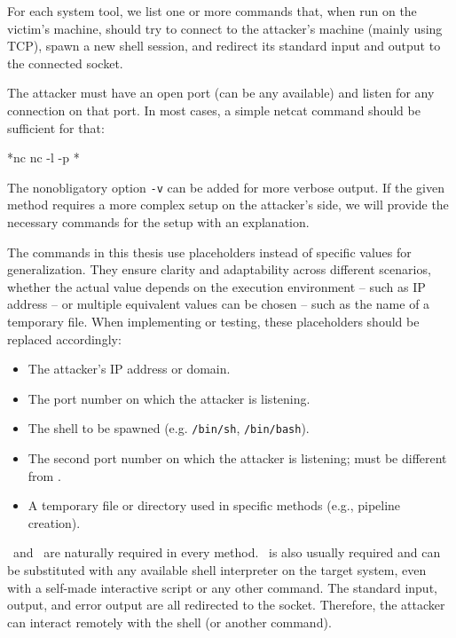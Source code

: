 For each system tool, we list one or more commands that, when run on the victim's machine, should try to connect to the attacker's machine (mainly using TCP), spawn a new shell session, and redirect its standard input and output to the connected socket.

The attacker must have an open port (can be any available) and listen for any connection on that port. In most cases, a simple netcat command should be sufficient for that:

\begin{cmdline}{*}{nc}{}
nc -l -p *\port*
\end{cmdline}

The nonobligatory option \texttt{-v} can be added for more verbose output. If the given method requires a more complex setup on the attacker's side, we will provide the necessary commands for the setup with an explanation.

The commands in this thesis use placeholders instead of specific values for generalization. They ensure clarity and adaptability across different scenarios, whether the actual value depends on the execution environment -- such as IP address -- or multiple equivalent values can be chosen -- such as the name of a temporary file. When implementing or testing, these placeholders should be replaced accordingly:

\setlength{\leftmargini}{5em}
\begin{itemize}
\item[\host] The attacker's IP address or domain.
\item[\port] The port number on which the attacker is listening.
\item[\shell] The shell to be spawned (e.g. \texttt{/bin/sh}, \texttt{/bin/bash}).
\item[\portt] The second port number on which the attacker is listening; must be different from \port.
\item[\tmp] A temporary file or directory used in specific methods (e.g., pipeline creation).
\end{itemize}
\setlength{\leftmargini}{2.5em}

\host\ and \port\ are naturally required in every method. \shell\ is also usually required and can be substituted with any available shell interpreter on the target system, even with a self-made interactive script or any other command. The standard input, output, and error output are all redirected to the socket. Therefore, the attacker can interact remotely with the shell (or another command).

